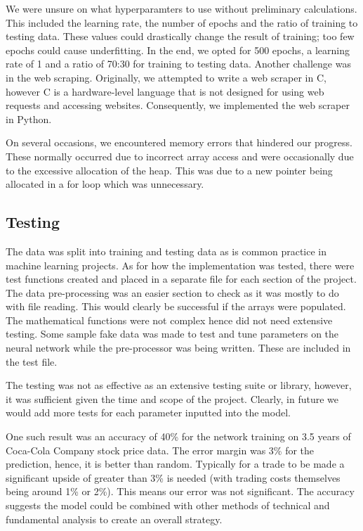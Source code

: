 \documentclass[11pt]{article}
\begin{document}
We were unsure on what hyperparamters to use without preliminary calculations. This included the learning rate, the number of epochs and the ratio of training to testing data. These values could drastically change the result of training; too few epochs could cause underfitting. 
In the end, we opted for 500 epochs, a learning rate of 1 and a ratio of 70:30 for training to testing data.
Another challenge was in the web scraping. Originally, we attempted to write a web scraper in C, however C is a hardware-level language that is not designed for using web requests and accessing websites. Consequently, we implemented the web scraper in Python.

On several occasions, we encountered memory errors that hindered our progress. These normally occurred due to incorrect array access and were occasionally due to the excessive allocation of the heap. This was due to a new pointer being allocated in a for loop which was unnecessary. 

\subsection{Testing}
The data was split into training and testing data as is common practice in machine learning projects. As for how the implementation was tested, there were test functions created and placed in a separate file for each section of the project. The data pre-processing was an easier section to check as it was mostly to do with file reading. This would clearly be successful if the arrays were populated. The mathematical functions were not complex hence did not need extensive testing. Some sample fake data was made to test and tune parameters on the neural network while the pre-processor was being written. These are included in the test file. 

The testing was not as effective as an extensive testing suite or library, however, it was sufficient given the time and scope of the project. Clearly, in future we would add more tests for each parameter inputted into the model.

One such result was an accuracy of 40\% for the network training on 3.5 years of Coca-Cola Company stock price data. The error margin was 3\% for the prediction, hence, it is better than random. Typically for a trade to be made a significant upside of greater than 3\% is needed (with trading costs themselves being around 1\% or 2\%). This means our error was not significant. The accuracy suggests the model could be combined with other methods of technical and fundamental analysis to create an overall strategy. 
\end{document}
